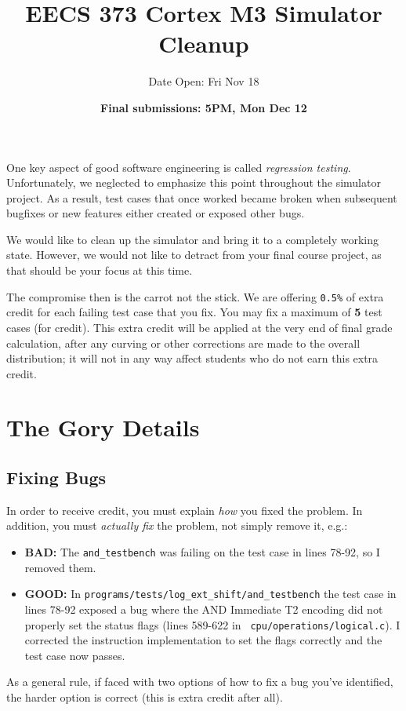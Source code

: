\documentclass{article}
\begin{document}
\pagestyle{fancyplain}

\title{EECS 373 Cortex M3 Simulator Cleanup}
\author{Date Open: Fri Nov 18}
\date{{\bf Final submissions: 5PM, Mon Dec 12}}
\maketitle

One key aspect of good software engineering is called {\em regression
testing}. Unfortunately, we neglected to emphasize this point throughout the
simulator project. As a result, test cases that once worked became broken when
subsequent bugfixes or new features either created or exposed other bugs.

We would like to clean up the simulator and bring it to a completely working
state. However, we would not like to detract from your final course project,
as that should be your focus at this time.

The compromise then is the carrot not the stick. We are offering {\tt 0.5\%}
of extra credit for each failing test case that you fix. You may fix a maximum
of {\bf 5} test cases (for credit). This extra credit will be applied at the
very end of final grade calculation, after any curving or other corrections
are made to the overall distribution; it will not in any way affect students
who do not earn this extra credit.

\section{The Gory Details}
\subsection {Fixing Bugs}
In order to receive credit, you must explain {\em how} you fixed the problem.
In addition, you must {\em actually fix} the problem, not simply remove it,
e.g.:
\begin{itemize}
\item {\bf BAD:} The {\tt and\_testbench} was failing on the test case in
lines 78-92, so I removed them.
\item {\bf GOOD:} In {\tt programs/tests/log\_ext\_shift/and\_testbench} the
test case in lines 78-92 exposed a bug where the AND Immediate T2 encoding did
not properly set the status flags (lines 589-622 in {\tt
cpu/operations/logical.c}).  I corrected the instruction implementation to set
the flags correctly and the test case now passes.
\end{itemize}
As a general rule, if faced with two options of how to fix a bug you've
identified, the harder option is correct (this is extra credit after all).
\end{document}
